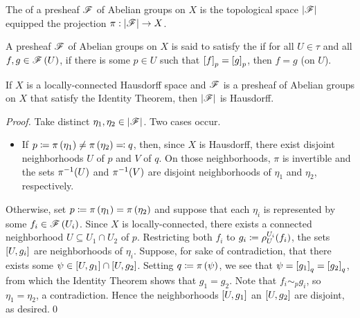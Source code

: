 \documentclass[../Moduli_Spaces_of_Riemann_Surfaces.tex]{subfiles}
\begin{document}
    \begin{definition}
        The  of a presheaf $\mathscr{F}$ of Abelian groups on $X$ is the topological space $\left|\mathscr{F}\right|$ equipped the projection $\pi:\left|\mathscr{F}\right|\to X$.
    \end{definition}
    \begin{definition}
        A presheaf $\mathscr{F}$ of Abelian groups on $X$ is said to satisfy the  if for all $U\in\tau$ and all $f,g\in\mathscr{F}\left(U\right)$, if there is some $p\in U$ such that $\left[f\right]_p=\left[g\right]_p$, then $f=g$ (on $U$).
    \end{definition}
    \begin{proposition}\label{2.2:prp:stalk_topology_Hausdorff}
        If $X$ is a locally-connected Hausdorff space and $\mathscr{F}$ is a presheaf of Abelian groups on $X$ that satisfy the Identity Theorem, then $\left|\mathscr{F}\right|$ is Hausdorff.
    \end{proposition}
    \begin{proof}
        Take distinct $\eta_1,\eta_2\in\left|\mathscr{F}\right|$. Two cases occur.
        \begin{itemize}
            \item If $p\coloneqq\pi\left(\eta_1\right)\neq\pi\left(\eta_2\right)\eqqcolon q$, then, since $X$ is Hausdorff, there exist disjoint neighborhoods $U$ of $p$ and $V$ of $q$. On those neighborhoods, $\pi$ is invertible and the sets $\pi^{-1}\!\left(U\right)$ and $\pi^{-1}\!\left(V\right)$ are disjoint neighborhoods of $\eta_1$ and $\eta_2$, respectively.
        \end{itemize}
        Otherwise, set $p\coloneqq\pi\left(\eta_1\right)=\pi\left(\eta_2\right)$ and suppose that each $\eta_i$ is represented by some $f_i\in\mathscr{F}\left(U_i\right)$. Since $X$ is locally-connected, there exists a connected neighborhood $U\subseteq U_1\cap U_2$ of $p$. Restricting both $f_i$ to $g_i\coloneqq\rho^{U_i}_U\!\left(f_i\right)$, the sets $\left[U,g_i\right]$ are neighborhoods of $\eta_i$. Suppose, for sake of contradiction, that there exists some $\psi\in\left[U,g_1\right]\cap\left[U,g_2\right]$. Setting $q\coloneqq\pi\left(\psi\right)$, we see that $\psi=\left[g_1\right]_q=\left[g_2\right]_q$, from which the Identity Theorem shows that $g_1=g_2$. Note that $f_i\sim_pg_i$, so $\eta_1=\eta_2$, a contradiction. Hence the neighborhoods $\left[U,g_1\right]$ an $\left[U,g_2\right]$ are disjoint, as desired.\qed
    \end{proof}
\end{document}
